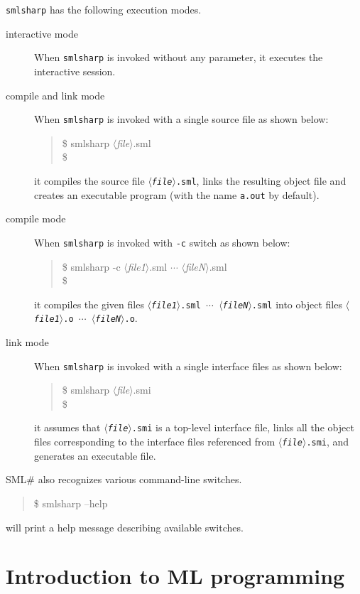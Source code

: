 \documentclass{jbook}
\newcommand{\txt}[2]{#2}
\newcommand{\smlsharp}{SML\#}
\newcommand{\nonterm}[1]{\mbox{$\langle$}{\it #1}\mbox{$\rangle$}}
\newenvironment{program}{\begin{quote}\begin{tt}}%
                        {\end{tt}\end{quote}}
\begin{document}
\else%
	{\tt smlsharp} has the following execution modes.
\begin{description}
\item[interactive mode]
When {\tt smlsharp} is invoked without any parameter,
it executes the interactive session.
\item[compile and link mode]
When {\tt smlsharp} is invoked with a single source file as shown below:
\begin{program}
\$ smlsharp \nonterm{file}.sml\\
\$ 
\end{program}
it compiles the source file {\tt \nonterm{file}.sml}, links the resulting
object file and creates an executable program (with the name {\tt a.out}
by default).
\item[compile mode]
When {\tt smlsharp} is invoked with {\tt -c} switch as shown below:
\begin{program}
\$ smlsharp -c \nonterm{file1}.sml $\cdots$ \nonterm{fileN}.sml \\
\$ 
\end{program}
it compiles the given files {\tt \nonterm{file1}.sml $\cdots$
\nonterm{fileN}.sml}
into object files {\tt \nonterm{file1}.o $\cdots$
\nonterm{fileN}.o}.
\item[link mode]
When {\tt smlsharp} is invoked with a single interface files as shown below:
\begin{program}
\$ smlsharp \nonterm{file}.smi \\
\$ 
\end{program}
it assumes that {\tt \nonterm{file}.smi} is a top-level interface file,
links all the object files corresponding to the interface files
referenced from {\tt \nonterm{file}.smi}, 
and generates an executable file.
\end{description}
	\smlsharp{} also recognizes various command-line switches.
\begin{program}
\$ smlsharp --help
\end{program}
will print a help message describing available switches.
\fi%

\chapter{\txt{MLプログラミング入門}{Introduction to ML programming}}
\label{chap:tutorialMlprogramming}
\end{document}
